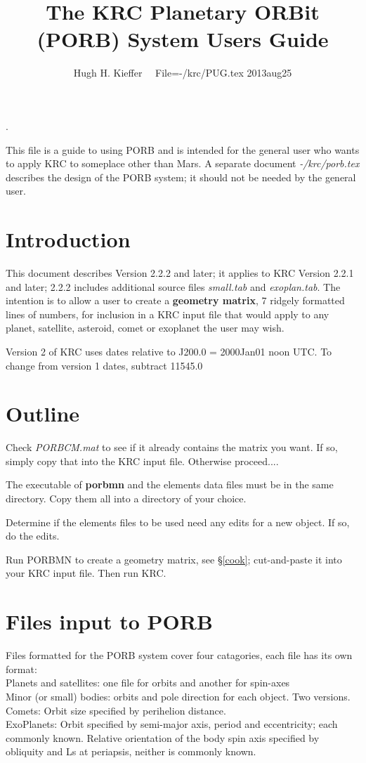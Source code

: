 \documentclass[draft]{article}  %
\title{The KRC Planetary ORBit (PORB) System Users Guide}
\author{Hugh H. Kieffer  \ \ File=-/krc/PUG.tex 2013aug25}
\newcommand{\np}{\textbf}  %
\newcommand{\nf}{\textit}  %
\newcommand{\qi}{\\ \hspace*{2.em}}      %
\begin{document}
\maketitle
\tableofcontents
\hrulefill .\hrulefill

This file is a guide to using PORB and is intended for the general user who
wants to apply KRC to someplace other than Mars.  A separate document
\nf{-/krc/porb.tex} describes the design of the PORB system; it should not be
needed by the general user.

\section{Introduction} 
This document describes Version 2.2.2 and later; it applies to KRC Version 2.2.1
and later; 2.2.2 includes additional source files \nf{small.tab} and
\nf{exoplan.tab}. The intention is to allow a user to create a \textbf{geometry matrix},
7 ridgely formatted lines of numbers,
for inclusion in a KRC input file that would apply to any planet, satellite,
asteroid, comet or exoplanet the user may wish.

Version 2 of KRC uses dates relative to J200.0 = 2000Jan01 noon UTC. To change
from version 1 dates, subtract 11545.0

\section{Outline}

Check \nf{PORBCM.mat} to see if it already contains the matrix you want. If so, simply copy that into the KRC input file. Otherwise proceed....

The executable of \np{porbmn} and the elements data files must be in the same directory. Copy them all into a directory of your choice.

Determine if the elements files to be used need any edits for a new object.
 If so, do the edits.

Run PORBMN to create a geometry matrix, see \S \ref{cook}; cut-and-paste it into your KRC input
file. Then run KRC.

\section{Files input to PORB} %
Files formatted for the PORB system cover four catagories, each file has its own format:
\qi Planets and satellites:  one file for orbits and another for spin-axes
\qi Minor (or small) bodies: orbits and pole direction for each object. Two versions.
\qi Comets: Orbit size specified by perihelion distance.  
\qi ExoPlanets: Orbit specified by semi-major axis, period and eccentricity; each commonly known. Relative orientation of the body spin axis specified by obliquity and Ls at periapsis, neither is commonly known.
\end{document}
